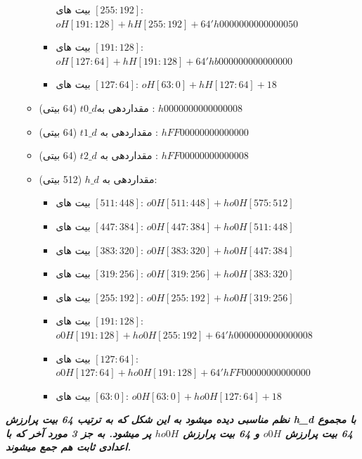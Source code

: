 \begin{itemize}
\begin{itemize}
\begin{itemize}
	      	      	      بیت های $[255:192]$:
	      	      	      $	oH[191:128] + hH[255:192] + 
	      	      	      64'h0000000000000050$
	      	      	\item
	      	      	      بیت های $[191:128]$:	
	      	      	      $oH[127: 64] + hH[191:128] + 64'hb000000000000000$
	      	      	\item
	      	      	      بیت های $[127:64]$:
	      	      	  $    	oH[ 63:  0] + hH[127: 64] + 18$
	      	      \end{itemize}
	      	\item
	      	      مقداردهی به$ t0\_d$ (64 بیتی) : $h0000000000000008$
	      	\item
	      	      مقداردهی به $t1\_d$ (64 بیتی) : $hFF00000000000000$
	      	\item
	      	      مقداردهی به $t2\_d$ (64 بیتی) : $hFF00000000000008$
	      	\item
	      	      مقداردهی به $h\_d$ (512 بیتی):
	      	      \begin{itemize}
	      	      	\item
	      	      	      بیت های $[511:448]$:
	      	      	      $ 	o0H[511:448] + ho0H[575:512]$
      	      	    \item
	      	      	      بیت های $[447:384]$:  
	      	      	      	$o0H[447:384] + ho0H[511:448]$
	      	      	\item
	      	      	      بیت های $[383:320]$:
	      	      	      $	o0H[383:320] + ho0H[447:384]$
	      	      	\item
	      	      	      بیت های $[319:256]$:
	      	      	      $	o0H[319:256] + ho0H[383:320]$
	      	      	\item
	      	      	      بیت های $[255:192]$:
	      	      	      $	o0H[255:192] + ho0H[319:256]$
	      	      	\item
	      	      	      بیت های $[191:128]$:	
	      	      	      $o0H[191:128] + ho0H[255:192] + 64'h0000000000000008$
	      	      	\item
	      	      	      بیت های $[127:64]$:	
	      	      	      $o0H[127: 64] + ho0H[191:128] + 64'hFF00000000000000$
	      	      	\item
	      	      	      بیت های $[63:0]$:	
	      	      	      $	o0H[ 63:  0] + ho0H[127: 64] + 18$
	      	      	 
	      	      \end{itemize}
	      \end{itemize}
\end{itemize}
\textit{
	\textbf{نظم مناسبی دیده میشود به این شکل که به ترتیب 64 بیت پرارزش h\_d با مجموع 64 بیت پرارزش $o0H$ و 64 بیت پرارزش $ho0H$ پر میشود. به جز 3 مورد آخر که با اعدادی ثابت هم جمع میشوند.
}}\\

